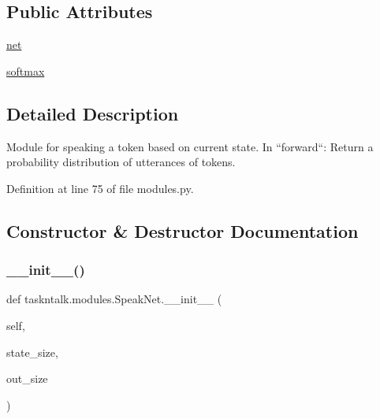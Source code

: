 \subsection*{Public Attributes}
\begin{DoxyCompactItemize}
\item 
\hyperlink{classtaskntalk_1_1modules_1_1SpeakNet_a54ceaef3494cf865cb201d08554eb1e2}{net}
\item 
\hyperlink{classtaskntalk_1_1modules_1_1SpeakNet_aaad557b1a44eca11d0d8d3c5022edb0a}{softmax}
\end{DoxyCompactItemize}


\subsection{Detailed Description}
\begin{DoxyVerb}Module for speaking a token based on current state. In ``forward``:
Return a probability distribution of utterances of tokens.
\end{DoxyVerb}
 

Definition at line 75 of file modules.\+py.



\subsection{Constructor \& Destructor Documentation}
\mbox{\label{classtaskntalk_1_1modules_1_1SpeakNet_a480014fc4ece3fb538e2f5fc502dc463}} 
\subsubsection{\texorpdfstring{\+\_\+\+\_\+init\+\_\+\+\_\+()}{\_\_init\_\_()}}
{\footnotesize\ttfamily def taskntalk.\+modules.\+Speak\+Net.\+\_\+\+\_\+init\+\_\+\+\_\+ (\begin{DoxyParamCaption}\item[{}]{self,  }\item[{}]{state\+\_\+size,  }\item[{}]{out\+\_\+size }\end{DoxyParamCaption})}



